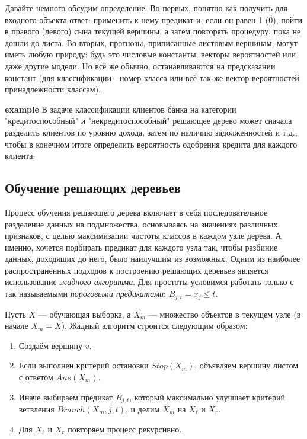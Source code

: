 Давайте немного обсудим определение. Во-первых, понятно как получить для входного объекта ответ: применить к нему предикат и, если он равен 1 (0), пойти в правого (левого) сына текущей вершины, а затем повторять процедуру, пока не дошли до листа. Во-вторых, прогнозы, приписанные листовым вершинам, могут иметь любую природу: будь это числовые константы, векторы вероятностей или даже другие модели. Но всё же обычно, останавливаются на предсказании констант (для классификации - номер класса или всё так же вектор вероятностей принадлежности классам).

\textbf{example}
В задаче классификации клиентов банка на категории "кредитоспособный" и "некредитоспособный" решающее дерево может сначала разделить клиентов по уровню дохода, затем по наличию задолженностей и т.д., чтобы в конечном итоге определить вероятность одобрения кредита для каждого клиента.

\subsection{Обучение решающих деревьев}
Процесс обучения решающего дерева включает в себя последовательное разделение данных на подмножества, основываясь на значениях различных признаков, с целью максимизации чистоты классов в каждом узле дерева. А именно, хочется подбирать предикат для каждого узла так, чтобы разбиние данных, доходящих до него, было наилучшим из возможных. Одним из наиболее распространённых подходов к построению решающих деревьев является использование \textit{жадного алгоритма}. Для простоты условимся работать только с так называемыми \textit{пороговыми предикатами}: $B_{j, t} = x_j \leq t$.

Пусть $X$ — обучающая выборка, а $X_m$ — множество объектов в текущем узле (в начале $X_m = X$). Жадный алгоритм строится следующим образом:

\begin{enumerate}
    \item Создаём вершину $v$.
    \item Если выполнен критерий остановки $Stop(X_m)$, объявляем вершину листом с ответом $Ans(X_m)$.
    \item Иначе выбираем предикат $B_{j,t}$, который максимально улучшает критерий ветвления $Branch(X_m, j, t)$, и делим $X_m$ на $X_{\ell}$ и $X_r$.
    \item Для $X_{\ell}$ и $X_r$ повторяем процесс рекурсивно.
\end{enumerate}

